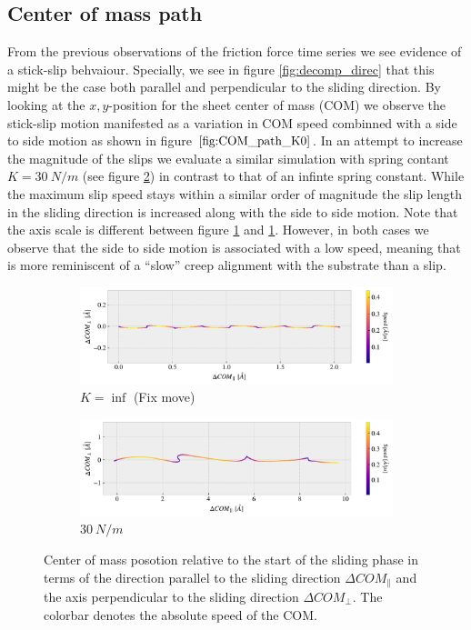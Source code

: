\subsection{Center of mass path}
From the previous observations of the friction force time series we see evidence
of a stick-slip behvaiour. Specially, we see in figure \ref{fig:decomp_direc}
that this might be the case both parallel and perpendicular to the sliding
direction. By looking at the $x,y$-position for the sheet center of mass (COM)
we observe the stick-slip motion manifested as a variation in COM speed combinned
with a side to side motion as shown in figure $\ref{fig:COM_path_K0}$. In an attempt to increase the magnitude of the slips we evaluate a similar simulation with spring contant $K = \SI{30}{N/m}$ (see figure
\ref{fig:COM_path_K30}) in contrast to that of an infinte spring constant. While
the maximum slip speed stays within a similar order of magnitude the slip length
in the sliding direction is increased along with the side to side motion. Note
that the axis scale is different between figure \ref{fig:COM_path_K0} and
\ref{fig:COM_path_K0}. However, in both cases we observe that the side to side
motion is associated with a low speed, meaning that is more reminiscent of a ``slow'' creep alignment with the substrate than a slip. 


\begin{figure}[H]
  \centering
  \begin{subfigure}[t]{0.85\textwidth}
    \centering
    \includegraphics[width=\textwidth]{figures/baseline/COM_path_K0.pdf}
    \caption{$K=\inf$ (Fix move)}
    \label{fig:COM_path_K0}
  \end{subfigure}
  \hfill
  \begin{subfigure}[t]{0.85\textwidth}
      \centering
      \includegraphics[width=\textwidth]{figures/baseline/COM_path_K30.pdf}
      \caption{$\SI{30}{N/m}$}
      \label{fig:COM_path_K30}
  \end{subfigure}
  \caption{Center of mass posotion relative to the start of the sliding phase in terms of the direction parallel to the sliding direction $\Delta COM_{\parallel}$ and the axis perpendicular to the sliding direction $\Delta COM_{\perp}$. The colorbar denotes the absolute speed of the COM.}
  \label{fig:COM_path}
\end{figure}


